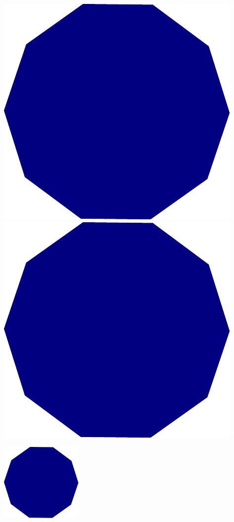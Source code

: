 \documentclass[12pt]{article}
\begin{document}
\begin{center}
\includegraphics[scale=0.3]{figuras/imagen1.pdf} \quad
\includegraphics[scale=0.4]{figuras/imagen1.pdf} \quad
\end{center}

\begin{center}
\includegraphics[width=4cm]{figuras/imagen1.pdf}
\end{center}
\end{document}
